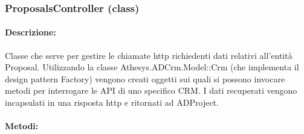 \subsubsection{ProposalsController (class)}

\paragraph{Descrizione:}
Classe che serve per gestire le chiamate http richiedenti dati relativi all'entità Proposal. Utilizzando la classe Athesys.ADCrm.Model::Crm (che implementa il design pattern Factory) vengono creati oggetti sui quali si possono invocare metodi per interrogare le API di uno specifico CRM. I dati recuperati vengono incapsulati in una risposta http e ritornati ad ADProject.

\paragraph{Metodi:}\hfill
